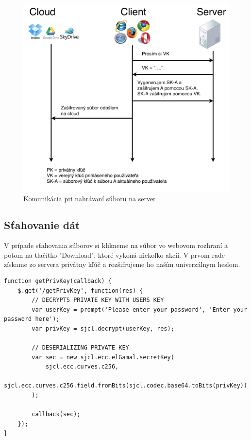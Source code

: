 		\begin{figure}[H]
			\begin{center}
				\includegraphics[width=1\linewidth]{images/nahravanie_com.png}
				\caption{Komunikácia pri nahrávaní súboru na server}
			\end{center}
		\end{figure}
	
	\subsection{Sťahovanie dát}
	
		V prípade sťahovania súborov si klikneme na súbor vo webovom rozhraní a potom na tlačítko "Download", ktoré vykoná niekoľko akcií. V prvom rade získame zo servera privátny kľúč a rozšifrujeme ho naším univerzálnym heslom.
		

		
\medskip
\begin{lstlisting}[caption=Získanie privátneho kľúča]	
function getPrivKey(callback) {
    $.get('/getPrivKey', function(res) {
        // DECRYPTS PRIVATE KEY WITH USERS KEY
        var userKey = prompt('Please enter your password', 'Enter your password here');
        var privKey = sjcl.decrypt(userKey, res);

        // DESERIALIZING PRIVATE KEY
        var sec = new sjcl.ecc.elGamal.secretKey(
            sjcl.ecc.curves.c256,
            sjcl.ecc.curves.c256.field.fromBits(sjcl.codec.base64.toBits(privKey))
        );

        callback(sec);
    });
}
\end{lstlisting}


